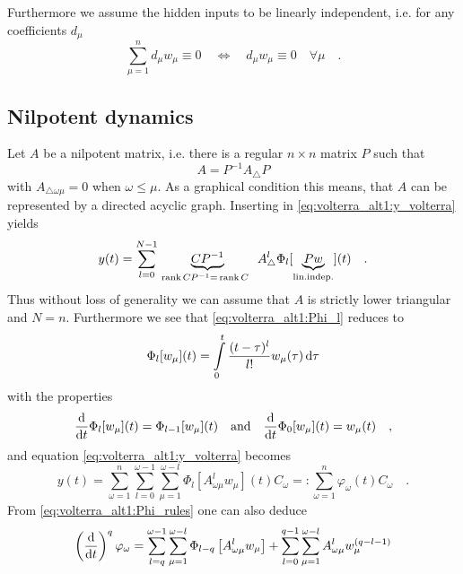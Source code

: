 Furthermore we assume the hidden inputs to be  
linearly independent, i.e. for any coefficients $d_\mu$
\begin{equation}
\sum\limits_{\mu=1}^n d_\mu w_\mu \equiv 0 \quad \Longleftrightarrow \quad 
d_\mu w_\mu \equiv 0 \quad \forall \mu \quad . 
\end{equation}

\subsection{Nilpotent dynamics}
Let $A$ be a nilpotent matrix, i.e. there is a regular $n\times n$ matrix $P$ such that
\begin{equation}
 A = P^{-1} A_\triangle P
\end{equation}
with $A_{\triangle \omega \mu} = 0$ when $\omega \leq \mu$. As a graphical condition this 
means, that $A$ can be represented by a directed acyclic graph. Inserting in  
\eqref{eq:volterra_alt1:y_volterra} yields
\begin{equation}
y(t) = \sum\limits_{l=0}^{N-1} \underbrace{CP^{-1}}_{ \, \text{rank}\,CP^{-1} 
= \, \text{rank}\,C \,\,  \,\,  } A^l_\triangle \Phi_l[\underbrace{Pw}_{ \text{lin.indep.}}](t) \quad .
\end{equation}
Thus without loss of generality we can assume that $A$ is strictly lower 
triangular and $N=n$. Furthermore we see that \eqref{eq:volterra_alt1:Phi_l} reduces to
\begin{equation}
\Phi_l[w_\mu](t) = \int\limits_0^t \frac{(t-\tau)^l}{l!} w_\mu(\tau) \, \text{d}\tau
\end{equation}
with the properties
\begin{equation}
\frac{\text{d}}{\text{d} t} \Phi_l[w_\mu](t) = \Phi_{l-1}[w_\mu](t)  
\quad \text{and} \quad \frac{\text{d}}{\text{d} t} \Phi_0[w_\mu](t) = w_\mu(t)
\quad , \label{eq:volterra_alt1:Phi_rules}
\end{equation}
and equation \eqref{eq:volterra_alt1:y_volterra} becomes
\begin{equation}
y(t) = \sum\limits_{\omega=1}^{n} \sum\limits_{l=0}^{\omega-1}  
\sum\limits_{\mu=1}^{\omega-l} 
 \Phi_l\left[A^l_{\omega\mu} w_\mu \right](t)  C_\omega 
=: \sum\limits_{\omega=1}^n \varphi_\omega (t) C_\omega 
 \quad . \label{eq:volterra_alt1_varphi}
\end{equation}
From \eqref{eq:volterra_alt1:Phi_rules} one can also deduce
\begin{equation}
\left(\frac{\text{d}}{\text{d} t}\right)^q \varphi_\omega = \sum\limits_{l=q}^{\omega-1} 
\sum\limits_{\mu=1}^{\omega-l} \Phi_{l-q}\left[A^l_{\omega\mu} w_\mu \right]
+\sum\limits_{l=0}^{q-1} \sum\limits_{\mu=1}^{\omega-l} A^l_{\omega\mu} 
w_\mu^{(q-l-1)} \label{eq:volterra_alt1:first_derivative}
\end{equation}
